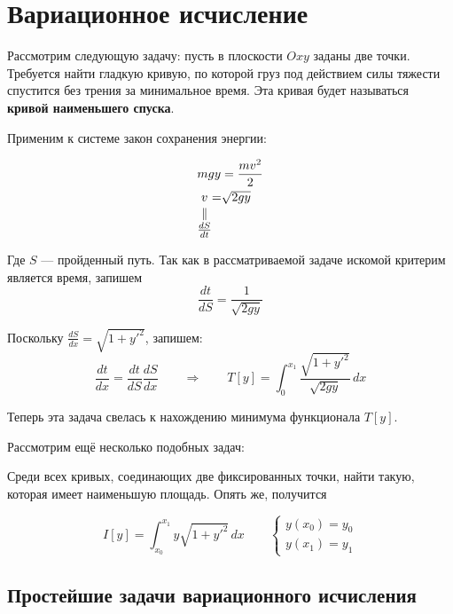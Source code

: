 \documentclass[12pt]{article}
\begin{document}
\section{Вариационное исчисление}

	Рассмотрим следующую задачу: пусть в плоскости $Oxy$ заданы две точки. Требуется найти гладкую кривую, 
	по которой груз под действием силы тяжести спустится без трения за минимальное время. Эта кривая будет
	называться \textbf{кривой наименьшего спуска}.
	
	
	Применим к системе закон сохранения энергии:
	
	\begin{align*}
		&mgy = \frac{mv^2}{2} \\
		&\begin{CD}
			v @.=@. \sqrt{2gy} @.\\
			\vspace{-27pt}\\
			\parallel @. @. @. \\
			\vspace{-27pt}\\
			\frac{dS}{dt} @. @. @.
		\end{CD}
	\end{align*}
	
	Где $S$ --- пройденный путь. Так как в рассматриваемой задаче искомой критерим является время, запишем
	$$\frac{dt}{dS} = \frac{1}{\sqrt{2gy}}$$
	
	Поскольку $\frac{dS}{dx} = \sqrt{1 + y'^2}$, запишем:
	$$\frac{dt}{dx} = \frac{dt}{dS} \frac{dS}{dx} \qquad\Rightarrow\qquad 
	  T[y] = \int_0^{x_1} \frac{\sqrt{1+y'^2}}{\sqrt{2gy}} \, dx$$
	  
	Теперь эта задача свелась к нахождению минимума функционала $T[y]$.
	
	Рассмотрим ещё несколько подобных задач:
	
	
	Среди всех кривых, соединающих две фиксированных точки, найти такую, которая имеет наименьшую площадь. Опять же, получится
	
	$$I[y] = \int_{x_0}^{x_1} y\sqrt{1 + y'^2}\,dx \qquad \left\{
	\begin{aligned}
		y(x_0) = y_0 \\
		y(x_1) = y_1
	\end{aligned}
	\right.$$
	
	\subsection{Простейшие задачи вариационного исчисления}
	
\end{document}
